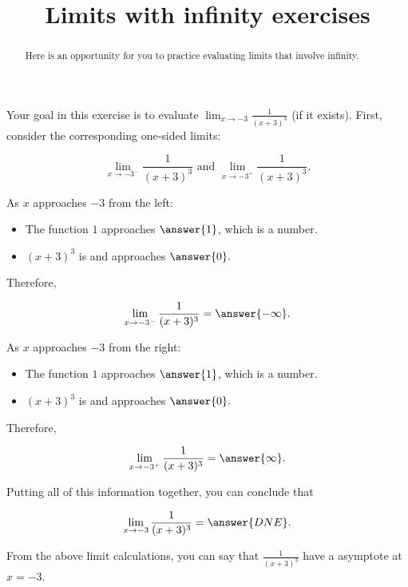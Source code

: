\documentclass[handout]{ximera}
\title{Limits with infinity exercises}
\begin{document}
\begin{abstract}
Here is an opportunity for you to practice evaluating limits that involve infinity.  
\end{abstract}
\maketitle

\begin{exercise}
Your goal in this exercise is to evaluate $\displaystyle\lim_{x \to -3} \frac{1}{(x+3)^3}$ (if it exists).  First, consider the corresponding one-sided limits:

$$\lim_{x \to -3^-} \frac{1}{(x+3)^3} \text{ and } \lim_{x \to -3^+} \frac{1}{(x+3)^3}.$$

As $x$ approaches $-3$ from the left:  

\begin{itemize}

\item The function $1$ approaches $\answer{1}$, which is a  number. 

\item $(x+3)^3$ is  and approaches $\answer{0}.$ 

\end{itemize}

Therefore, 

 \[ \lim_{x \to -3^-} \frac{1}{(x+3)^3} = \answer{-\infty}.\]
 
As $x$ approaches $-3$ from the right: 

\begin{itemize}

\item The function $1$ approaches $\answer{1}$, which is a  number. 

\item $(x+3)^3$ is  and approaches $\answer{0}.$ 

\end{itemize}

Therefore, 

 \[ \lim_{x \to -3^+} \frac{1}{(x+3)^3} = \answer{\infty}. \]

Putting all of this information together, you can conclude that

\[ \lim_{x \to -3} \frac{1}{(x+3)^3} = \answer{DNE}. \]

\begin{exercise}

From the above limit calculations, you can say that $\frac{1}{(x+3)^3}$  have a  asymptote at $x =-3$. 

\end{exercise}

\end{exercise}
\end{document}
